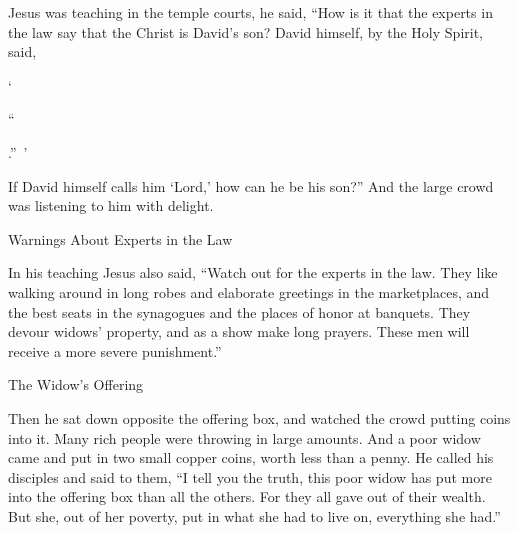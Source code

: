 {Jesus
was teaching
in
the temple courts,
he said,
“How
is it that the experts in the law
say
that
the Christ
is
David’s
son?
David
himself,
by
the Holy
Spirit,
said,
\par }{\Q ‘{}
\par }{\Q “{}
\par }{.” ’
\par }{\PI {}If David
himself
calls
him
‘Lord,’
how can
he be
his
son?” And
the large
crowd
was listening
to him
with delight.
\par }{\SH Warnings About Experts in the Law
\par }{\PP {}In
his
teaching
Jesus also
said,
“Watch out
for
the experts in the law.
They like
walking around
in
long robes
and
elaborate greetings
in
the marketplaces,
and
the best seats
in
the synagogues
and
the places of honor
at
banquets.
They devour
widows’
property,
and as a show
make
long
prayers.
These men
will receive
a
more severe
punishment.”
\par }{\SH The Widow’s Offering
\par }{\PP {}Then
he sat down
opposite
the offering box,
and watched
the crowd
putting
coins
into
it.
Many
rich people
were throwing
in large amounts.
And
a
poor
widow
came
and put in
two
small copper coins,
worth less than a penny.
He called
his
disciples
and said
to them,
“I tell
you
the truth,
this
poor
widow
has put
more
into
the offering box
than
all the others.
For
they all
gave
out of
their
wealth.
But
she,
out
of her poverty,
put
in
what she had
to live
on, everything she had.”

}

